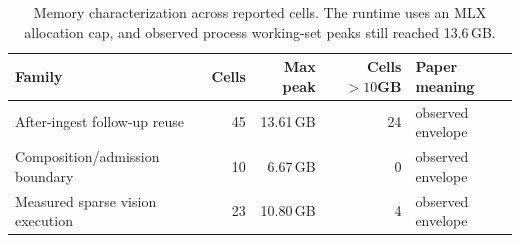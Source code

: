 \begin{table}[H]
\centering
\caption{Memory characterization across reported cells. The runtime uses an MLX allocation cap, and observed process working-set peaks still reached 13.6\,GB.}
\label{tab:memory-characterization}
\small
\renewcommand{\arraystretch}{\PaperTableStretch}
\begin{tabularx}{\linewidth}{@{}Y r r r Y@{}}
\toprule
Family & Cells & Max peak & Cells \(>10\)GB & Paper meaning \\
\midrule
After-ingest follow-up reuse & 45 & 13.61\,GB & 24 & observed envelope \\
Composition/admission boundary & 10 & 6.67\,GB & 0 & observed envelope \\
Measured sparse vision execution & 23 & 10.80\,GB & 4 & observed envelope \\
\bottomrule
\end{tabularx}
\end{table}

